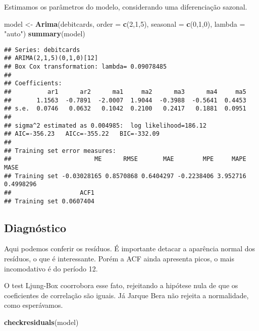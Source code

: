 \documentclass[]{article}
\newenvironment{Shaded}{\begin{snugshade}}{\end{snugshade}}
\newcommand{\DataTypeTok}[1]{\textcolor[rgb]{0.13,0.29,0.53}{#1}}
\newcommand{\DecValTok}[1]{\textcolor[rgb]{0.00,0.00,0.81}{#1}}
\newcommand{\KeywordTok}[1]{\textcolor[rgb]{0.13,0.29,0.53}{\textbf{#1}}}
\newcommand{\NormalTok}[1]{#1}
\newcommand{\StringTok}[1]{\textcolor[rgb]{0.31,0.60,0.02}{#1}}
\begin{document}
Estimamos os parâmetros do modelo, considerando uma diferenciação
sazonal.

\begin{Shaded}
\begin{Highlighting}[]
\NormalTok{model <-}\StringTok{ }\KeywordTok{Arima}\NormalTok{(debitcards, }\DataTypeTok{order =} \KeywordTok{c}\NormalTok{(}\DecValTok{2}\NormalTok{,}\DecValTok{1}\NormalTok{,}\DecValTok{5}\NormalTok{), }\DataTypeTok{seasonal =} \KeywordTok{c}\NormalTok{(}\DecValTok{0}\NormalTok{,}\DecValTok{1}\NormalTok{,}\DecValTok{0}\NormalTok{), }\DataTypeTok{lambda =} \StringTok{"auto"}\NormalTok{)}
\KeywordTok{summary}\NormalTok{(model)}
\end{Highlighting}
\end{Shaded}

\begin{verbatim}
## Series: debitcards 
## ARIMA(2,1,5)(0,1,0)[12] 
## Box Cox transformation: lambda= 0.09078485 
## 
## Coefficients:
##          ar1      ar2      ma1     ma2      ma3      ma4     ma5
##       1.1563  -0.7891  -2.0007  1.9044  -0.3988  -0.5641  0.4453
## s.e.  0.0746   0.0632   0.1042  0.2100   0.2417   0.1881  0.0951
## 
## sigma^2 estimated as 0.004985:  log likelihood=186.12
## AIC=-356.23   AICc=-355.22   BIC=-332.09
## 
## Training set error measures:
##                       ME      RMSE       MAE        MPE     MAPE      MASE
## Training set -0.03028165 0.8570868 0.6404297 -0.2238406 3.952716 0.4998296
##                   ACF1
## Training set 0.0607404
\end{verbatim}

\hypertarget{diagnuxf3stico-1}{%
\subsection{Diagnóstico}\label{diagnuxf3stico-1}}

Aqui podemos conferir os resíduos. É importante detacar a aparência
normal dos resíduos, o que é interessante. Porém a ACF ainda apresenta
picos, o mais incomodativo é do período 12.

O test Ljung-Box coorrobora esse fato, rejeitando a hipótese nula de que
os coeficientes de correlação são iguais. Já Jarque Bera não rejeita a
normalidade, como esperávamos.

\begin{Shaded}
\begin{Highlighting}[]
\KeywordTok{checkresiduals}\NormalTok{(model)}
\end{Highlighting}
\end{Shaded}
\end{document}
